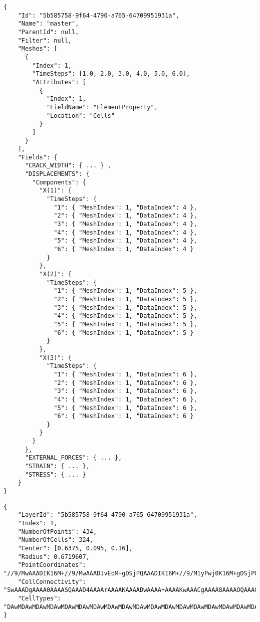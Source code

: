 \begin{lstlisting}[style=json,caption=Example of summary.json document.,label=lst:summary.json]
{
    "Id": "5b585758-9f64-4790-a765-64709951931a",
    "Name": "master",
    "ParentId": null,
    "Filter": null,
    "Meshes": [
      {
        "Index": 1,
        "TimeSteps": [1.0, 2.0, 3.0, 4.0, 5.0, 6.0],
        "Attributes": [
          {
            "Index": 1,
            "FieldName": "ElementProperty",
            "Location": "Cells"
          }
        ]
      }
    ],
    "Fields": {
      "CRACK_WIDTH": { ... } ,
      "DISPLACEMENTS": {
        "Components": {
          "X(1)": {
            "TimeSteps": {
              "1": { "MeshIndex": 1, "DataIndex": 4 },
              "2": { "MeshIndex": 1, "DataIndex": 4 },
              "3": { "MeshIndex": 1, "DataIndex": 4 },
              "4": { "MeshIndex": 1, "DataIndex": 4 },
              "5": { "MeshIndex": 1, "DataIndex": 4 },
              "6": { "MeshIndex": 1, "DataIndex": 4 }
            }
          },
          "X(2)": {
            "TimeSteps": {
              "1": { "MeshIndex": 1, "DataIndex": 5 },
              "2": { "MeshIndex": 1, "DataIndex": 5 },
              "3": { "MeshIndex": 1, "DataIndex": 5 },
              "4": { "MeshIndex": 1, "DataIndex": 5 },
              "5": { "MeshIndex": 1, "DataIndex": 5 },
              "6": { "MeshIndex": 1, "DataIndex": 5 }
            }
          },
          "X(3)": {
            "TimeSteps": {
              "1": { "MeshIndex": 1, "DataIndex": 6 },
              "2": { "MeshIndex": 1, "DataIndex": 6 },
              "3": { "MeshIndex": 1, "DataIndex": 6 },
              "4": { "MeshIndex": 1, "DataIndex": 6 },
              "5": { "MeshIndex": 1, "DataIndex": 6 },
              "6": { "MeshIndex": 1, "DataIndex": 6 }
            }
          }
        }
      },
      "EXTERNAL_FORCES": { ... },
      "STRAIN": { ... },
      "STRESS": { ... }
    }
}
\end{lstlisting}

\begin{lstlisting}[style=json,caption=Example of mesh.json document.,label=lst:mesh.json]
{
    "LayerId": "5b585758-9f64-4790-a765-64709951931a",
    "Index": 1,
    "NumberOfPoints": 434,
    "NumberOfCells": 324,
    "Center": [0.6375, 0.095, 0.16],
    "Radius": 0.6719607,
    "PointCoordinates": "//9/MwAAADIK16M+//9/MwAAADJvEoM+gDSjPQAAADIK16M+//9/M1yPwj0K16M+gDSjPQAAAD...",
    "CellConnectivity": "SwAAADgAAAA0AAAASQAAAD4AAAArAAAAKAAAADwAAAA+AAAAKwAAACgAAAA8AAAAOQAAACUAAA...",
    "CellTypes": "DAwMDAwMDAwMDAwMDAwMDAwMDAwMDAwMDAwMDAwMDAwMDAwMDAwMDAwMDAwMDAwMDAwMDAwMDAwMDAwMD..."
}
\end{lstlisting}

